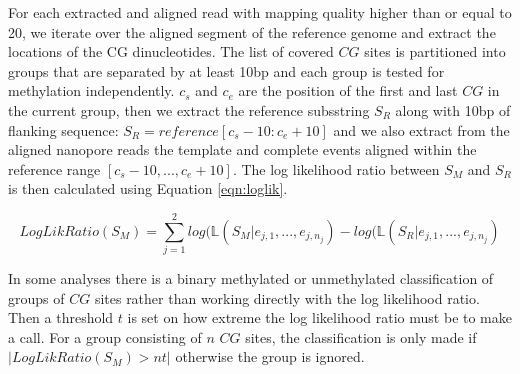 For each extracted and aligned read with mapping quality higher than or equal to 20, we iterate over the aligned segment of the reference genome and extract the locations of the CG dinucleotides. The list of covered $CG$ sites is partitioned into groups that are separated by at least 10bp and each group is tested for methylation independently. $c_s$ and $c_e$ are the position of the first and last $CG$ in the current group, then we extract the reference subsstring $S_R$ along with 10bp of flanking sequence: $S_R = reference[c_s-10 : c_e+10]$ and we also extract from the aligned nanopore reads the template and complete events aligned within the reference range $[c_s-10,...,c_e+10]$. The log likelihood ratio between $S_M$ and $S_R$ is then calculated using Equation \ref{eqn:loglik}.

\begin{equation}
\label{eqn:loglik}
    LogLikRatio(S_M) = \sum_{j=1}^2 log(\mathds{L}(S_M | e_{j,1},...,e_{j,n_j})-log(\mathds{L}(S_R | e_{j,1},...,e_{j,n_j})
\end{equation}

In some analyses there is a binary methylated or unmethylated classification of groups of $CG$ sites rather than working directly with the log likelihood ratio. Then a threshold $t$ is set on how extreme the log likelihood ratio must be to make a call. For a group consisting of $n$ $CG$ sites, the classification is only made if $|LogLikRatio(S_M)> nt|$ otherwise the group is ignored.


